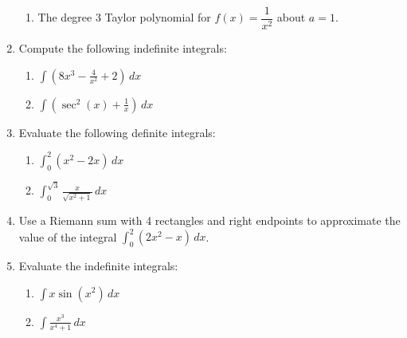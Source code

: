 \documentclass[12pt]{article}
\newcommand{\points}[1]{\marginpar{\hspace{24pt}[#1]}}
\newcommand{\di}{\displaystyle}
\begin{document}
\begin{enumerate}
\begin{enumerate}
  \item The degree 3 Taylor polynomial for $f(x) = \dfrac{1}{x^2}$ about $a=1$. \points{4}
  \end{enumerate}
  
  
  \item Compute the following indefinite integrals:
  \begin{enumerate}
  \item $\di \int \left(8x^3 - \frac{4}{x^2}+2\right)\,dx$ \points{2}
  
  
  \item $\di \int\left(\sec^2(x)+\frac{1}{x}\right)\,dx$ \points{2}
  \end{enumerate}
  
\pagebreak

    \item Evaluate the following definite integrals:
  \begin{enumerate}
  \item $\di \int_0^2(x^2-2x)\,dx$ \points{3}
  
  
  \item $\di \int_0^{\sqrt{3}}\frac{x}{\sqrt{x^2+1}}\,dx$ \points{3}
  \end{enumerate}
  
  
  \item Use a Riemann sum with 4 rectangles and right endpoints to approximate the value of the integral $\di \int_0^2 (2x^2-x)\,dx$. \points{4}
  

\item Evaluate the indefinite integrals: 
  \begin{enumerate}
  \item $\di \int x\sin(x^2)\,dx$ \points{3}
  
  
  \item $\di \int \frac{x^3}{x^4+1}\,dx$ \points{3}
 
  \end{enumerate}  


\bigskip



\end{enumerate}
\end{document}
